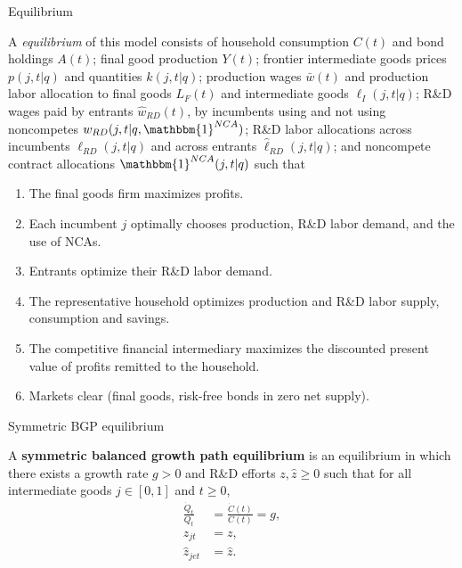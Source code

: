 \documentclass[english,usenames,dvipsnames]{beamer}
\begin{document}
\begin{frame}{Equilibrium}\label{definition:equilibrium}
	\hyperlink{model:firm_ownership}{}
\begin{definition}
	\tiny
	A \emph{equilibrium} of this model consists of household consumption $C(t)$ and bond holdings $A(t)$; final good production $Y(t)$; frontier intermediate goods prices $p(j,t|q)$ and quantities $k(j,t|q)$; production wages $\bar{w}(t)$ and production labor allocation to final goods $L_{F}(t)$ and intermediate goods $\ell_I(j,t|q)$; R\&D wages paid by entrants $\hat{w}_{RD}(t)$, by incumbents using and not using noncompetes $w_{RD}(j,t|q,\mathbbm{1}^{NCA})$; R\&D labor allocations across incumbents $\ell_{RD}(j,t|q)$ and across entrants $\hat{\ell}_{RD}(j,t|q)$; and noncompete contract allocations $\mathbbm{1}^{NCA}(j,t|q)$ such that 
	\begin{enumerate}
		\item The final goods firm maximizes profits.
		\item Each incumbent $j$ optimally chooses production, R\&D labor demand, and the use of NCAs.
		\item Entrants optimize their R\&D labor demand.
		\item The representative household optimizes production and R\&D labor supply, consumption and savings.
		\item The competitive financial intermediary maximizes the discounted present value of profits remitted to the household.
		\item Markets clear (final goods, risk-free bonds in zero net supply).
	\end{enumerate}
\end{definition}
\end{frame}

\begin{frame}{Symmetric BGP equilibrium}\label{definition:symmetric_bgp}
	\hyperlink{characterizing_BGP}{}
	\begin{definition}
		A \textbf{symmetric balanced growth path equilibrium} is an equilibrium in which there exists a growth rate $g > 0$ and R\&D efforts $z,\hat{z} \ge 0$ such that for all intermediate goods $j \in [0,1]$ and $t \ge 0$, 
		\begin{align*}
			\frac{\dot{Q}_t}{Q_t} &= \frac{\dot{C}(t)}{C(t)} = g, \\
			z_{jt} &= z, \\
			\hat{z}_{jet} &= \hat{z}.
		\end{align*}
	\end{definition}
\end{frame}
\end{document}
